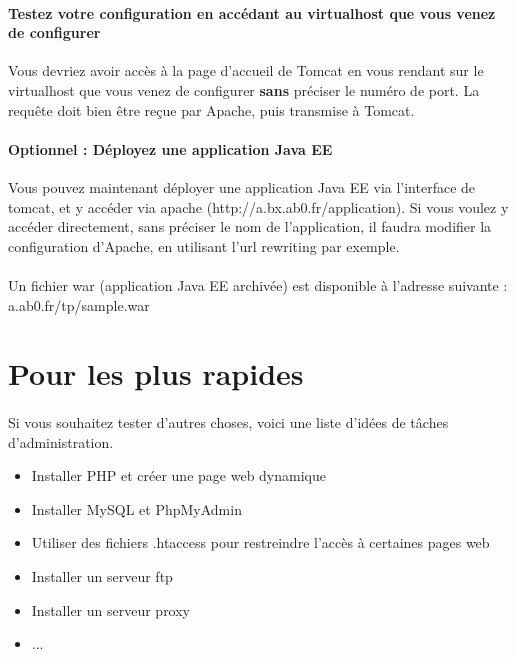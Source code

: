 \documentclass[12pt,a4paper]{article}
\begin{document}
\paragraph{Testez votre configuration en accédant au virtualhost que vous venez de configurer\\}
Vous devriez avoir accès à la page d'accueil de Tomcat en vous rendant sur le virtualhost que vous venez de configurer \textbf{sans} préciser le numéro de port. La requête doit bien être reçue par Apache, puis transmise à Tomcat.

\paragraph{Optionnel : Déployez une application Java EE\\}
Vous pouvez maintenant déployer une application Java EE via l'interface de tomcat, et y accéder via apache (http://a.bx.ab0.fr/application). Si vous voulez y accéder directement, sans préciser le nom de l'application, il faudra modifier la configuration d'Apache, en utilisant l'url rewriting par exemple.

\paragraph{}
Un fichier war (application Java EE archivée) est disponible à l'adresse suivante : a.ab0.fr/tp/sample.war

\section{Pour les plus rapides}

\paragraph{}
Si vous souhaitez tester d'autres choses, voici une liste d'idées de tâches d'administration.
\begin{itemize}
\item Installer PHP et créer une page web dynamique
\item Installer MySQL et PhpMyAdmin
\item Utiliser des fichiers .htaccess pour restreindre l'accès à certaines pages web
\item Installer un serveur ftp
\item Installer un serveur proxy
\item ...
\end{itemize}
\end{document}
